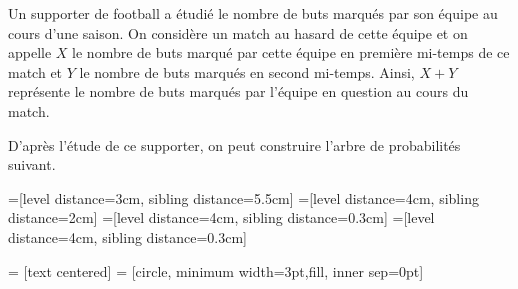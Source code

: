 \documentclass[11pt,fleqn, openany]{book} %
\begin{document}
\begin{example} 
Un supporter de football a étudié le nombre de buts marqués par son équipe au cours d'une saison. On considère un match au hasard de cette équipe et on appelle $X$ le nombre de buts marqué par cette équipe en première mi-temps de ce match et $Y$ le nombre de buts marqués en second mi-temps. Ainsi, $X+Y$ représente le nombre de buts marqués par l'équipe en question au cours du match.

D'après l'étude de ce supporter, on peut construire l'arbre de probabilités suivant.

=[level distance=3cm, sibling distance=5.5cm]
=[level distance=4cm, sibling distance=2cm]
=[level distance=4cm, sibling distance=0.3cm]
=[level distance=4cm, sibling distance=0.3cm]

 = [text centered]
 = [circle, minimum width=3pt,fill, inner sep=0pt]



\end{example}
\end{document}
